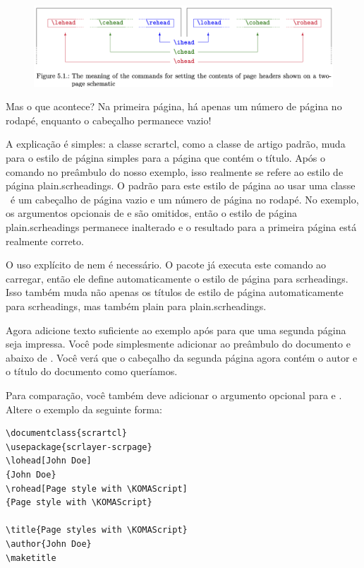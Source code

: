 \begin{figure}
    \centering
    \includegraphics[width=1\linewidth]{imagens/imagem04.png}
\end{figure}

Mas o que acontece? Na primeira página, há apenas um número de página no rodapé, enquanto o cabeçalho permanece vazio!

A explicação é simples: a classe scrartcl, como a classe de artigo padrão, muda para o estilo de página simples para a página que contém o título. Após o comando  no preâmbulo do nosso exemplo, isso realmente se refere ao estilo de página plain.scrheadings. O padrão para este estilo de página ao usar uma classe \KOMAScript\ é um cabeçalho de página vazio e um número de página no rodapé. No exemplo, os argumentos opcionais de  e  são omitidos, então o estilo de página plain.scrheadings permanece inalterado e o resultado para a primeira página está realmente correto.

O uso explícito de  nem é necessário. O pacote já executa este comando ao carregar, então ele define automaticamente o estilo de página para scrheadings. Isso também muda não apenas os títulos de estilo de página automaticamente para scrheadings, mas também plain para plain.scrheadings.

Agora adicione texto suficiente ao exemplo após  para que uma segunda página seja impressa. Você pode simplesmente adicionar  ao preâmbulo do documento e  abaixo de . Você verá que o cabeçalho da segunda página agora contém o autor e o título do documento como queríamos.

Para comparação, você também deve adicionar o argumento opcional para 
 e . Altere o exemplo da seguinte forma:

\begin{verbatim}
\documentclass{scrartcl}
\usepackage{scrlayer-scrpage}
\lohead[John Doe]
{John Doe}
\rohead[Page style with \KOMAScript]
{Page style with \KOMAScript}

\title{Page styles with \KOMAScript}
\author{John Doe}
\maketitle

\end{verbatim}

